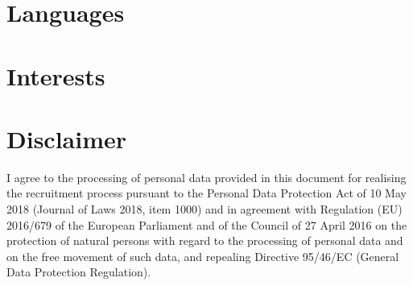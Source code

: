 \documentclass[11pt,a4paper,sans]{moderncv}
\begin{document}
\section{Languages}


\section{Interests}


\section{Disclaimer}

I agree to the processing of personal data provided in this document for 
realising the recruitment process pursuant to the Personal Data Protection Act 
of 10 May 2018 (Journal of Laws 2018, item 1000) and in agreement with 
Regulation (EU) 2016/679 of the European Parliament and of the Council of 27 
April 2016 on the protection of natural persons with regard to the processing 
of personal data and on the free movement of such data, and repealing Directive 
95/46/EC (General Data Protection Regulation).



\end{document}
